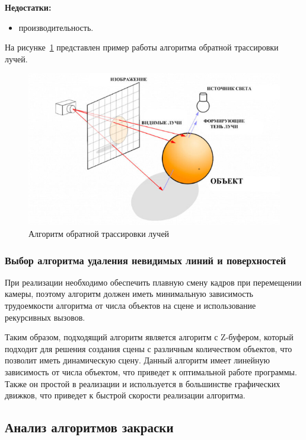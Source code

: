 \textbf{Недостатки:}
\begin{itemize}
	\item производительность.
\end{itemize}
\clearpage
На рисунке~\ref{img:direct-ray-tracing} представлен пример работы алгоритма обратной трассировки лучей.
\begin{figure}[h]
	\centering
	\includegraphics[height=0.3\textheight]{img/direct-ray-tracing.png}
	\caption{Алгоритм обратной трассировки лучей \cite{raytracin}}
	\label{img:direct-ray-tracing}
\end{figure}

\subsubsection{Выбор алгоритма удаления невидимых линий и поверхностей}

При реализации необходимо обеспечить плавную смену кадров при перемещении камеры, поэтому алгоритм должен иметь минимальную зависимость трудоемкости алгоритма от числа объектов на сцене и использование рекурсивных вызовов.

Таким образом, подходящий алгоритм является алгоритм с Z-буфером, который подходит для решения создания сцены с различным количеством объектов, что позволит иметь динамическую сцену.
Данный алгоритм имеет линейную зависимость от числа объектом, что приведет к оптимальной работе программы.
Также он простой в реализации и используется в большинстве графических движков, что приведет к быстрой скорости реализации алгоритма.

\subsection{Анализ алгоритмов закраски}

